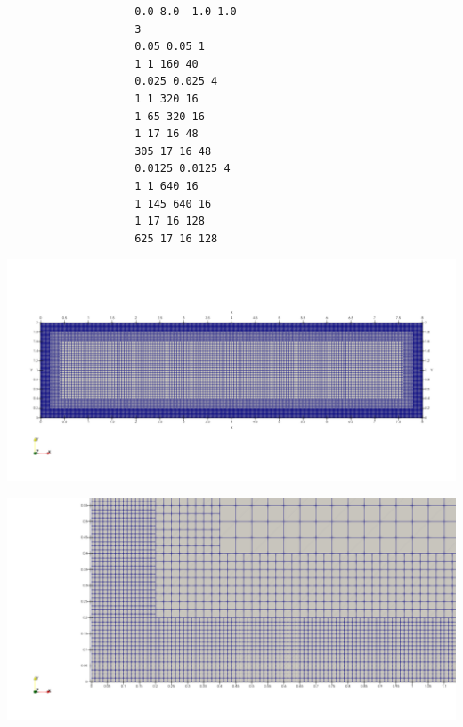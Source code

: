 \documentclass[../main/main.tex]{subfiles}
\begin{document}
\begin{frame}[fragile]{}
	\vspace{-0.4cm}
	\begin{center}
		\begin{minipage}{0.30\textwidth}
			{\footnotesize
				\begin{verbatim}
					0.0 8.0 -1.0 1.0
					3
					0.05 0.05 1
					1 1 160 40
					0.025 0.025 4
					1 1 320 16
					1 65 320 16
					1 17 16 48
					305 17 16 48
					0.0125 0.0125 4
					1 1 640 16
					1 145 640 16
					1 17 16 128
					625 17 16 128
				\end{verbatim}
			}
		\end{minipage}
		\hfill
		\begin{minipage}{0.65\textwidth}
			\includegraphics[width=\textwidth]{imgs/ref3.png}
			
			\includegraphics[height=0.35\textheight]{imgs/ref3_border.png}
		\end{minipage}
	\end{center}
\end{frame}
\end{document}
